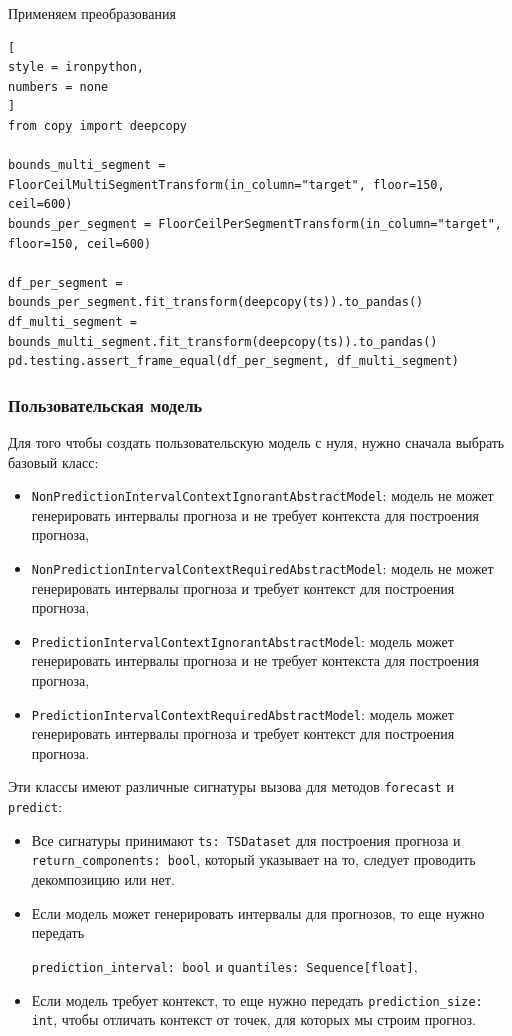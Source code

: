\documentclass[%
	11pt,
	a4paper,
	utf8,
		]{article}
\begin{document}
Применяем преобразования
\begin{lstlisting}[
style = ironpython,
numbers = none
]
from copy import deepcopy

bounds_multi_segment = FloorCeilMultiSegmentTransform(in_column="target", floor=150, ceil=600)
bounds_per_segment = FloorCeilPerSegmentTransform(in_column="target", floor=150, ceil=600)

df_per_segment = bounds_per_segment.fit_transform(deepcopy(ts)).to_pandas()
df_multi_segment = bounds_multi_segment.fit_transform(deepcopy(ts)).to_pandas()
pd.testing.assert_frame_equal(df_per_segment, df_multi_segment)
\end{lstlisting}

\subsubsection{Пользовательская модель}

Для того чтобы создать пользовательскую модель с нуля, нужно сначала выбрать базовый класс:
\begin{itemize}
	\item \verb|NonPredictionIntervalContextIgnorantAbstractModel|: модель не может генерировать интервалы прогноза и не требует контекста для построения прогноза,
	
	\item \verb|NonPredictionIntervalContextRequiredAbstractModel|: модель не может генерировать интервалы прогноза и требует контекст для построения прогноза,
	
	\item \verb|PredictionIntervalContextIgnorantAbstractModel|: модель может генерировать интервалы прогноза и не требует контекста для построения прогноза,
	
	\item \verb|PredictionIntervalContextRequiredAbstractModel|: модель может генерировать интервалы прогноза и требует контекст для построения прогноза.
\end{itemize}

Эти классы имеют различные сигнатуры вызова для методов \verb|forecast| и \verb|predict|:
\begin{itemize}
	\item Все сигнатуры принимают \verb|ts: TSDataset| для построения прогноза и \verb|return_components: bool|, который указывает на то, следует проводить декомпозицию или нет.
	
	\item Если модель может генерировать интервалы для прогнозов, то еще нужно передать
	
	 \verb|prediction_interval: bool| и \verb|quantiles: Sequence[float]|,
	
	\item Если модель требует контекст, то еще нужно передать \verb|prediction_size: int|, чтобы отличать контекст от точек, для которых мы строим прогноз.
\end{itemize}
\end{document}
